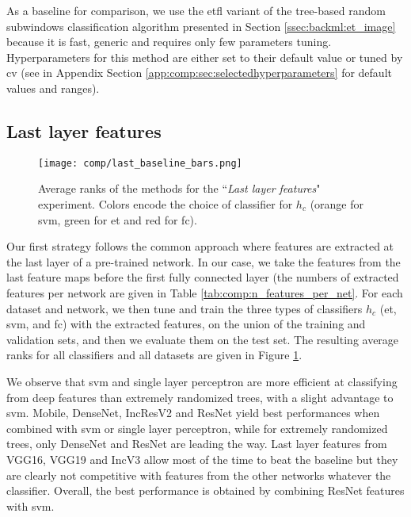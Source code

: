 As a baseline for comparison, we use the \acrshort{etfl} variant of the tree-based random subwindows classification algorithm presented in Section \ref{ssec:backml:et_image} because it is fast, generic and requires only few parameters tuning. Hyperparameters for this method are either set to their default value or tuned by \acrlong{cv} (see in Appendix Section \ref{app:comp:sec:selectedhyperparameters} for default values and ranges).

\subsection{Last layer features}
\label{ssec:comp:exp_last_layer}

\begin{figure}
    \centering
    \texttt{[image: comp/last\_baseline\_bars.png]}
    \caption{Average ranks of the methods for the ``\textit{Last layer features}" experiment. Colors encode the choice of classifier for $h_c$ (orange for \acrshort{svm}, green for \acrshort{et} and red for \acrshort{fc}).}
    \label{fig:comp:avg_ranks_last_layer}
\end{figure}

Our first strategy follows the common approach where features are extracted at the last layer of a pre-trained network. In our case, we take the features from the last feature maps before the first fully connected layer (the numbers of extracted features per network are given in Table \ref{tab:comp:n_features_per_net}. For each dataset and network, we then tune and train the three types of classifiers $h_c$ (\acrshort{et}, \acrshort{svm}, and \acrshort{fc}) with the extracted features, on the union of the training and validation sets, and then we evaluate them on the test set. The resulting average ranks for all classifiers and all datasets are given in Figure \ref{fig:comp:avg_ranks_last_layer}.

We observe that \acrshort{svm} and single layer perceptron are more efficient at classifying from deep features than extremely randomized trees, with a slight advantage to \acrshort{svm}. Mobile, DenseNet, IncResV2 and ResNet yield best performances when combined with \acrshort{svm} or single layer perceptron, while for extremely randomized trees, only DenseNet and ResNet are leading the way. Last layer features from VGG16, VGG19 and IncV3 allow most of the time to beat the baseline but they are clearly not competitive with features from the other networks whatever the classifier. Overall, the best performance is obtained by combining ResNet features with \acrshort{svm}.


